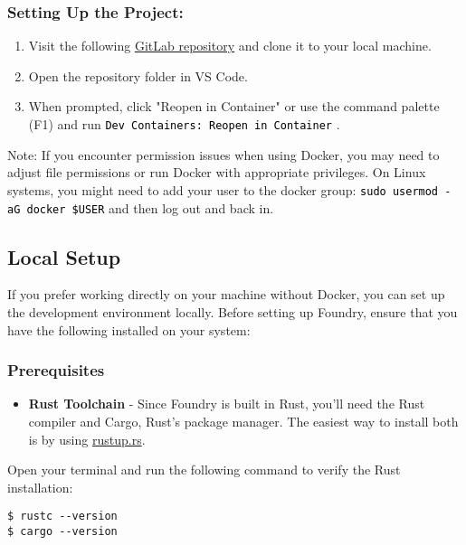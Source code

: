\documentclass[12pt]{article}
\newcommand{\codegrey}[1]{%
  \texttt{\colorbox{black!4}{\textcolor{black}{#1}}}%
}
\begin{document}
\subsubsection*{Setting Up the Project:}

\begin{enumerate}
  \item Visit the following \href{https://gitlab.fel.cvut.cz/radovluk/smart-contracts-exercises/-/tree/main/01-Hello-Blockchain-World/task/task-code}{GitLab repository} and clone it to your local machine.
  \item Open the repository folder in VS Code.
  \item When prompted, click "Reopen in Container" or use the command palette (F1) and run \codegrey{Dev Containers: Reopen in Container}.
\end{enumerate}

\noindent
Note: If you encounter permission issues when using Docker, you may need to adjust file permissions or run Docker with appropriate privileges. On Linux systems, you might need to add your user to the docker group: \codegrey{sudo usermod -aG docker \$USER} and then log out and back in.

\subsection{Local Setup}

If you prefer working directly on your machine without Docker, you can set up the development environment locally. Before setting up Foundry, ensure that you have the following installed on your system:

\subsubsection*{Prerequisites}
\begin{itemize}
    \item \textbf{Rust Toolchain} - Since Foundry is built in Rust, you'll need the Rust compiler and Cargo, Rust's package manager. The easiest way to install both is by using \href{https://rustup.rs/}{rustup.rs}.
\end{itemize}

\noindent
Open your terminal and run the following command to verify the Rust installation:

\begin{verbatim}
$ rustc --version
$ cargo --version
\end{verbatim}
\end{document}
